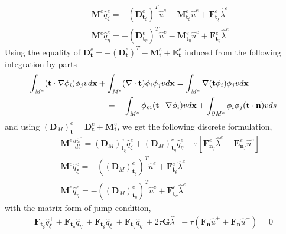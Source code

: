 \documentclass{elsart}
\begin{document}
\begin{eqnarray*}
& & \mathbf{M}^e \hat{q}_{\xi}^e = - \left ( \mathbf{D}^e_{\mathbf{t}_{\xi}} \right )^T \hat{u}^e - \mathbf{M}^e_{\mathbf{t}_{\xi}} \hat{u}^e + \mathbf{F}^e_{\mathbf{t}_{\xi}} \hat{\lambda}^e \label{meqn_q1} \\
& & \mathbf{M}^e \hat{q}_{\eta}^e = - \left ( \mathbf{D}^e_{\mathbf{t}_{\eta}} \right )^T \hat{u}^e - \mathbf{M}^e_{\mathbf{t}_{\eta}} \hat{u}^e + \mathbf{F}^e_{\mathbf{t}_{\eta}} \hat{\lambda}^e \label{meqn_q2} 
\end{eqnarray*}
Using the equality of $\mathbf{D}_{\mathbf{t}}^e = - ( \mathbf{D}^e_{\mathbf{t}})^T - \mathbf{M}_{\mathbf{t}}^e + \mathbf{E}_{\mathbf{t}}^e$ induced from the following integration by parts
\begin{eqnarray*}
\lefteqn{ \int_{\mathit{M}^e} ( \mathbf{t} \cdot \nabla \phi_i) \phi_j v d \mathbf{x} + \int_{\mathit{M}^e} (\nabla \cdot \mathbf{t}  ) \phi_i \phi_j v d \mathbf{x} = \int_{\mathit{M}^e} \nabla ( \mathbf{t} \phi_i) \phi_j v d \mathbf{x} } \hspace{3cm} \\
& & = - \int_{\mathit{M}^e} \phi_m ( \mathbf{t} \cdot \nabla \phi_i) v d \mathbf{x} + \int_{\partial \mathit{M}^e} \phi_i \phi_j (\mathbf{t} \cdot \mathbf{n} ) v ds
\end{eqnarray*}
and using $\left ( \mathbf{D}_{\mathit{M}} \right )_{\mathbf{t}}^e= \mathbf{D}_{\mathbf{t}}^e + \mathbf{M}_{\mathbf{t}}^e$, we get the following discrete formulation,
\begin{eqnarray}
& & \mathbf{M}^e \frac{d \hat{u}^e}{dt} = \left ( \mathbf{D}_{\mathit{M}} \right )^e_{\mathbf{t}_{\xi}}  \hat{q}_{\xi}^e +  \left ( \mathbf{D}_{\mathit{M}} \right )^e_{\mathbf{t}_{\eta}} \hat{q}_{\eta}^e - \tau \left [ \mathbf{F}^e_{\mathbf{n}_f} \hat{\lambda}^e - \mathbf{E}^e_{\mathbf{n}_f} \hat{u}^e  \right ]  \label{meqn_uf} \\
& & \mathbf{M}^e \hat{q}_{\xi}^e = - \left (  \left ( \mathbf{D}_{\mathit{M}} \right )^e_{\mathbf{t}_{\xi}} \right )^T \hat{u}^e + \mathbf{F}^e_{\mathbf{t}_{\xi}} \hat{\lambda}^e \label{meqn_qf1} \\
& & \mathbf{M}^e \hat{q}_{\eta}^e = - \left (  \left ( \mathbf{D}_{\mathit{M}} \right )^e_{\mathbf{t}_{\eta}} \right )^T \hat{u}^e + \mathbf{F}^e_{\mathbf{t}_{\eta}} \hat{\lambda}^e \label{meqn_qf2} 
\end{eqnarray}
with the matrix form of jump condition,
\begin{eqnarray}
\mathbf{F}_{\mathbf{t}_{\xi}} \hat{q}_{\xi}^+ + \mathbf{F}_{\mathbf{t}_{\eta}} \hat{q}_{\eta}^+ + \mathbf{F}_{\mathbf{t}_{\xi}} \hat{q}_{\xi}^- + \mathbf{F}_{\mathbf{t}_{\eta}} \hat{q}_{\eta}^-
+ 2 \tau \mathbf{G} \hat{\lambda}^- - \tau \left ( \mathbf{F}_{\mathbf{n}} \hat{u}^+ + \mathbf{F}_{\mathbf{n}} \hat{u}^-   \right ) = 0 \label{matrixjumpcond}
\end{eqnarray}
\end{document}
